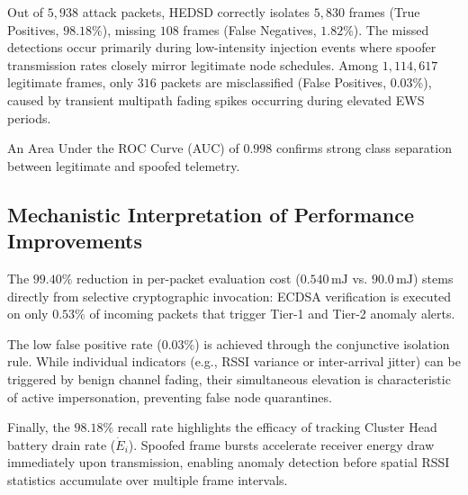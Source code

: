 \documentclass[conference]{IEEEtran}
\begin{document}
\begin{table}[htbp]
\caption{Confusion Matrix of Proposed HEDSD Spoofing Detection Protocol}
\label{tab_confusion_matrix}
\centering
\small
\renewcommand{\arraystretch}{1.2}
\end{table}

Out of $5,938$ attack packets, HEDSD correctly isolates $5,830$ frames (True Positives, $98.18\%$), missing $108$ frames (False Negatives, $1.82\%$). The missed detections occur primarily during low-intensity injection events where spoofer transmission rates closely mirror legitimate node schedules. Among $1,114,617$ legitimate frames, only $316$ packets are misclassified (False Positives, $0.03\%$), caused by transient multipath fading spikes occurring during elevated EWS periods.

An Area Under the ROC Curve (AUC) of $0.998$ confirms strong class separation between legitimate and spoofed telemetry.

\subsection{Mechanistic Interpretation of Performance Improvements}
The $99.40\%$ reduction in per-packet evaluation cost ($0.540\,\text{mJ}$ vs. $90.0\,\text{mJ}$) stems directly from selective cryptographic invocation: ECDSA verification is executed on only $0.53\%$ of incoming packets that trigger Tier-1 and Tier-2 anomaly alerts.

The low false positive rate ($0.03\%$) is achieved through the conjunctive isolation rule. While individual indicators (e.g., RSSI variance or inter-arrival jitter) can be triggered by benign channel fading, their simultaneous elevation is characteristic of active impersonation, preventing false node quarantines.

Finally, the $98.18\%$ recall rate highlights the efficacy of tracking Cluster Head battery drain rate ($\dot{E}_i$). Spoofed frame bursts accelerate receiver energy draw immediately upon transmission, enabling anomaly detection before spatial RSSI statistics accumulate over multiple frame intervals.
\end{document}
